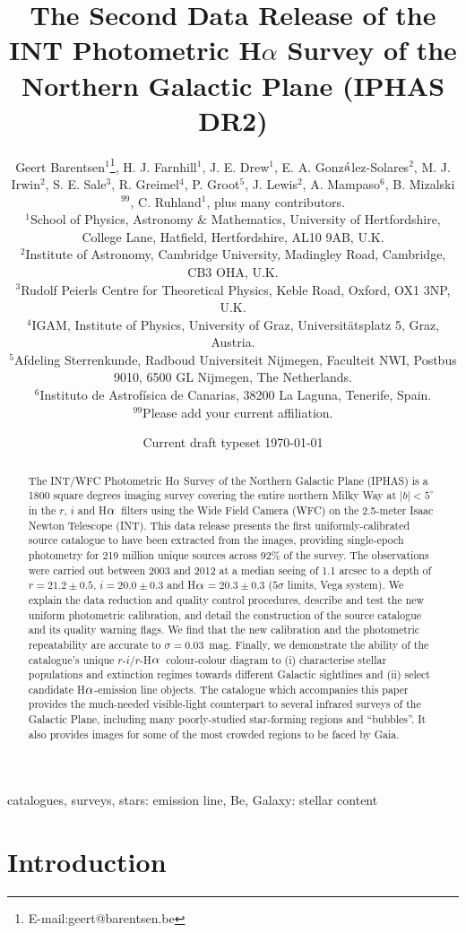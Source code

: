 \documentclass[useAMS,usenatbib]{mn2e}
\title[IPHAS Data Release 2]{The Second Data Release 
of the INT Photometric H$\alpha$ Survey 
of the Northern Galactic Plane (IPHAS DR2)}
\author[G. Barentsen
et. al]{Geert Barentsen$^{1}$\thanks{E-mail:geert@barentsen.be},
H. J. Farnhill$^1$,
J. E. Drew$^1$,
E. A. Gonz$\acute{\rm{a}}$lez-Solares$^2$, \newauthor
M. J. Irwin$^2$,
S. E. Sale$^3$,
R. Greimel$^4$,
P. Groot$^5$,
J. Lewis$^2$,
A. Mampaso$^6$, \newauthor
B. Mizalski$^{99}$,
C. Ruhland$^1$,
plus many contributors.
\newauthor\\
$^{1}$School of Physics, Astronomy \& Mathematics, University of Hertfordshire, College Lane, Hatfield, Hertfordshire, AL10 9AB, U.K.\\
$^{2}$Institute of Astronomy, Cambridge University, Madingley Road, Cambridge, CB3 OHA, U.K.\\
$^{3}$Rudolf Peierls Centre for Theoretical Physics, Keble Road, Oxford, OX1 3NP, U.K.\\
$^{4}$IGAM, Institute of Physics, University of Graz, Universit\"atsplatz 5, Graz, Austria.\\
$^{5}$Afdeling Sterrenkunde, Radboud Universiteit Nijmegen, Faculteit NWI, Postbus 9010, 6500 GL Nijmegen, The Netherlands.\\
$^{6}$Instituto de Astrof\'isica de Canarias, 38200 La Laguna, Tenerife, Spain.\\
$^{99}$Please add your current affiliation.\\
}
\def\ha{\mbox{H$\rm \alpha$}}
\begin{document}
\date{Current draft typeset \today}
\pagerange{\pageref{firstpage}--\pageref{lastpage}} 

\maketitle

\label{firstpage}

\begin{abstract} %
The INT/WFC Photometric H$\alpha$ Survey 
of the Northern Galactic Plane (IPHAS)
is a 1800 square degrees imaging survey
covering the entire northern Milky Way at $|b| < 5^\circ$
in the $r$, $i$ and \ha\ filters 
using the Wide Field Camera (WFC) 
on the 2.5-meter Isaac Newton Telescope (INT).
This data release presents the first 
uniformly-calibrated source catalogue
to have been extracted from the images,
providing single-epoch photometry
for 219 million unique sources
across 92\% of the survey.
The observations were carried out between 2003 and 2012
at a median seeing of 1.1 arcsec
to a depth of $r=21.2\pm 0.5$, $i=20.0\pm 0.3$ and \ha$=20.3\pm 0.3$
($5\sigma$ limits, Vega system).
We explain the data reduction 
and quality control procedures,
describe and test the new uniform photometric calibration,
and detail the construction of the source catalogue
and its quality warning flags.
We find that the new calibration
and the photometric repeatability are accurate to
$\sigma=0.03$~mag.
Finally, we demonstrate the ability of the 
catalogue's unique
$r$-$i$/$r$-\ha\ colour-colour diagram to
(i) characterise stellar populations and extinction regimes
towards different Galactic sightlines
and (ii) select candidate \ha-emission line objects.
The catalogue which accompanies this paper
provides the much-needed visible-light counterpart
to several infrared surveys of the Galactic Plane,
including many poorly-studied star-forming regions and ``bubbles''.
It also provides images for some of the most
crowded regions to be faced by Gaia.
\end{abstract}

\begin{keywords}
catalogues, surveys, stars: emission line, Be, Galaxy: stellar content
\end{keywords}

\section{Introduction}
\end{document}
